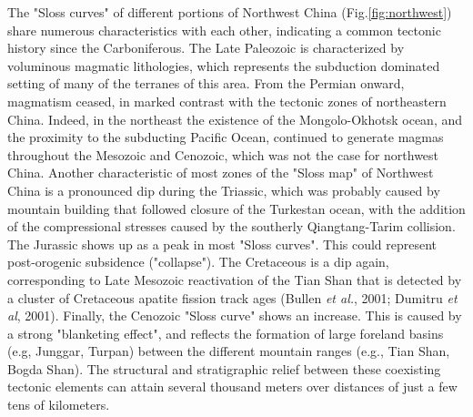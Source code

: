 \documentclass{article}
\begin{document}
 The  "Sloss   curves"  of  different  portions   of  Northwest  China
 (Fig.\ref{fig:northwest})  share numerous  characteristics  with each
 other, indicating a common  tectonic history since the Carboniferous.
 The   Late  Paleozoic   is  characterized   by   voluminous  magmatic
 lithologies,  which represents  the subduction  dominated  setting of
 many  of  the  terranes  of  this area.   From  the  Permian  onward,
 magmatism  ceased, in  marked  contrast with  the  tectonic zones  of
 northeastern China.   Indeed, in the  northeast the existence  of the
 Mongolo-Okhotsk ocean,  and the  proximity to the  subducting Pacific
 Ocean,  continued  to generate  magmas  throughout  the Mesozoic  and
 Cenozoic,  which  was not  the  case  for  northwest China.   Another
 characteristic of most zones of the "Sloss map" of Northwest China is
 a pronounced  dip during the  Triassic, which was probably  caused by
 mountain building that followed  closure of the Turkestan ocean, with
 the addition  of the compressional  stresses caused by  the southerly
 Qiangtang-Tarim collision.  The  Jurassic shows up as a  peak in most
 "Sloss  curves".   This   could  represent  post-orogenic  subsidence
 ("collapse"). The  Cretaceous is a  dip again, corresponding  to Late
 Mesozoic reactivation of the Tian  Shan that is detected by a cluster
 of Cretaceous apatite  fission track ages (Bullen {\it  et al.}, 2001;
 Dumitru  {\it et  al}, 2001).   Finally, the  Cenozoic  "Sloss curve"
 shows an  increase. This is  caused by a strong  "blanketing effect",
 and reflects  the formation of  large foreland basins  (e.g, Junggar,
 Turpan) between the different mountain ranges (e.g., Tian Shan, Bogda
 Shan).   The  structural   and  stratigraphic  relief  between  these
 coexisting tectonic elements can  attain several thousand meters over
 distances of just a few tens of kilometers.
\end{document}
